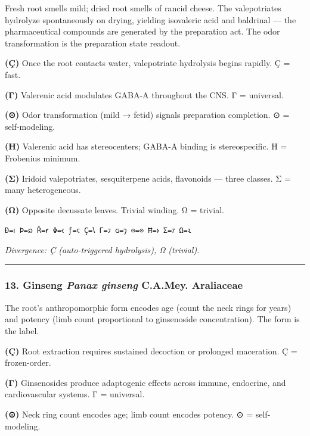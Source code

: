 \documentclass[12pt,a4paper]{article}
\begin{document}
Fresh root smells mild; dried root smells of rancid cheese. The
valepotriates hydrolyze spontaneously on drying, yielding isovaleric
acid and baldrinal --- the pharmaceutical compounds are generated by the
preparation act. The odor transformation is the preparation state
readout.

\textbf{(Ç)} Once the root contacts water, valepotriate hydrolysis
begins rapidly. Ç = fast.

\textbf{(Γ)} Valerenic acid modulates GABA-A throughout the CNS. Γ =
universal.

\textbf{(⊙)} Odor transformation (mild → fetid) signals preparation
completion. ⊙ = self-modeling.

\textbf{(Ħ)} Valerenic acid has stereocenters; GABA-A binding is
stereospecific. Ħ = Frobenius minimum.

\textbf{(Σ)} Iridoid valepotriates, sesquiterpene acids, flavonoids ---
three classes. Σ = many heterogeneous.

\textbf{(Ω)} Opposite decussate leaves. Trivial winding. Ω = trivial.

\texttt{Ð=𐑦\ Þ=𐑸\ Ř=𐑾\ Φ=𐑬\ ƒ=𐑱\ Ç=𐑘\ Γ=𐑲\ ɢ=𐑠\ ⊙=⊙\ Ħ=𐑶\ Σ=𐑳\ Ω=𐑷}

\emph{Divergence: Ç (auto-triggered hydrolysis), Ω (trivial).}

\begin{center}\rule{0.5\linewidth}{0.5pt}\end{center}

\hypertarget{ginseng-panax-ginseng-c.a.mey.-araliaceae}{%
\subsubsection{\texorpdfstring{13. Ginseng \textbar{} \emph{Panax
ginseng} C.A.Mey. \textbar{}
Araliaceae}{13. Ginseng \textbar{} Panax ginseng C.A.Mey. \textbar{} Araliaceae}}\label{ginseng-panax-ginseng-c.a.mey.-araliaceae}}

The root's anthropomorphic form encodes age (count the neck rings for
years) and potency (limb count proportional to ginsenoside
concentration). The form is the label.

\textbf{(Ç)} Root extraction requires sustained decoction or prolonged
maceration. Ç = frozen-order.

\textbf{(Γ)} Ginsenosides produce adaptogenic effects across immune,
endocrine, and cardiovascular systems. Γ = universal.

\textbf{(⊙)} Neck ring count encodes age; limb count encodes potency. ⊙
= self-modeling.
\end{document}

